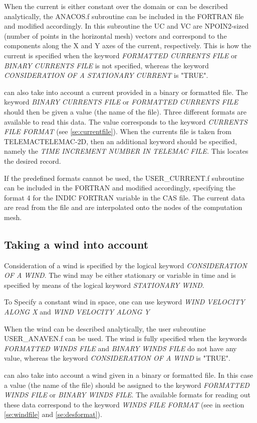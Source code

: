  When the current is either constant over the domain or can be described analytically, the ANACOS.f subroutine can be included in the
 FORTRAN file and modified accordingly. In this subroutine the UC and VC are NPOIN2-sized (number of points in the horizontal mesh)
 vectors and correspond to the components along the X and Y axes of the current, respectively. This is how the current is specified
 when the keyword \textit{FORMATTED CURRENTS FILE} or \textit{BINARY CURRENTS FILE }is not specified, whereas the keyword
 \textit{CONSIDERATION OF A STATIONARY CURRENT} is "TRUE".

 \tomawac can also take into account a current provided in a binary or formatted file. The keyword \textit{BINARY CURRENTS FILE} or
 \textit{FORMATTED CURRENTS FILE} should then be given a value (the name of the file). Three different formats are available to read
 this data. The value corresponds to the keyword \textit{CURRENTS FILE FORMAT} (see \ref{se:currentfile}). When the currents file is
 taken from TELEMACTELEMAC-2D, then an additional keyword should be specified, namely the \textit{TIME INCREMENT NUMBER IN TELEMAC FILE.}
 This locates the desired record.

 If the predefined formats cannot be used, the USER\_CURRENT.f subroutine can be included in the FORTRAN and modified accordingly,
 specifying the format 4 for the INDIC FORTRAN variable in the CAS file. The current data are read from the file and are interpolated
 onto the nodes of the computation mesh.


\subsection{ Taking a wind into account}
\label{se:wind}
Consideration of a wind is specified by the logical keyword \textit{CONSIDERATION OF A WIND}. The wind may be either stationary or
variable in time and is specified by means of the logical keyword \textit{STATIONARY WIND}.

To Specify a constant wind in space, one can use keyword \textit{WIND VELOCITY ALONG X} and \textit{WIND VELOCITY ALONG Y}

When the wind can be described analytically, the user subroutine USER\_ANAVEN.f can be used. The wind is fully specified when the
keywords \textit{FORMATTED WINDS FILE} and \textit{BINARY WINDS FILE} do not have any value, whereas the keyword \textit{CONSIDERATION
  OF A WIND }is "TRUE".

\tomawac can also take into account a wind given in a binary or formatted file. In this case a value (the name of the file) should be
assigned to the keyword \textit{FORMATTED WINDS FILE }or \textit{BINARY WINDS FILE}. The available formats for reading out these data
correspond to the keyword \textit{WINDS FILE FORMAT} (see in section \ref{se:windfile} and \ref{se:desformat}).

